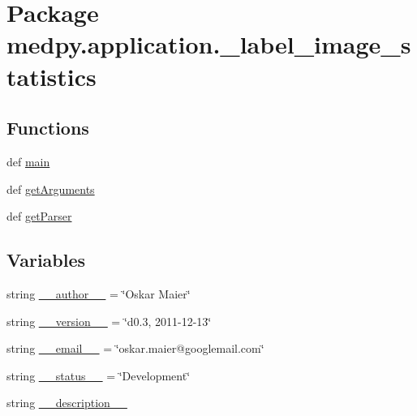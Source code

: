\hypertarget{namespacemedpy_1_1application_1_1__label__image__statistics}{
\section{Package medpy.application.\_\-label\_\-image\_\-statistics}
\label{namespacemedpy_1_1application_1_1__label__image__statistics}
}
\subsection*{Functions}
\begin{DoxyCompactItemize}
\item 
def \hyperlink{namespacemedpy_1_1application_1_1__label__image__statistics_a2c1d45a8008064380645892e0f95e5ca}{main}
\item 
def \hyperlink{namespacemedpy_1_1application_1_1__label__image__statistics_a964042adffe9118a95344c01aebad118}{getArguments}
\item 
def \hyperlink{namespacemedpy_1_1application_1_1__label__image__statistics_aa70e52a2053e1b2c4ca10edbcc695224}{getParser}
\end{DoxyCompactItemize}
\subsection*{Variables}
\begin{DoxyCompactItemize}
\item 
string \hyperlink{namespacemedpy_1_1application_1_1__label__image__statistics_ac1fb29054aca3abac7efd9e5c775a262}{\_\-\_\-author\_\-\_\-} = \char`\"{}Oskar Maier\char`\"{}
\item 
string \hyperlink{namespacemedpy_1_1application_1_1__label__image__statistics_aedb6621ea1308c7336d894e5be91a77a}{\_\-\_\-version\_\-\_\-} = \char`\"{}d0.3, 2011-\/12-\/13\char`\"{}
\item 
string \hyperlink{namespacemedpy_1_1application_1_1__label__image__statistics_a5ef93e745da4efbfc1c49b0b55a42678}{\_\-\_\-email\_\-\_\-} = \char`\"{}oskar.maier@googlemail.com\char`\"{}
\item 
string \hyperlink{namespacemedpy_1_1application_1_1__label__image__statistics_abd26d3f7d9aa64642a0406775b63da08}{\_\-\_\-status\_\-\_\-} = \char`\"{}Development\char`\"{}
\item 
string \hyperlink{namespacemedpy_1_1application_1_1__label__image__statistics_ab9b9ebf539e9dfe78ece32d0697325d5}{\_\-\_\-description\_\-\_\-}
\end{DoxyCompactItemize}


